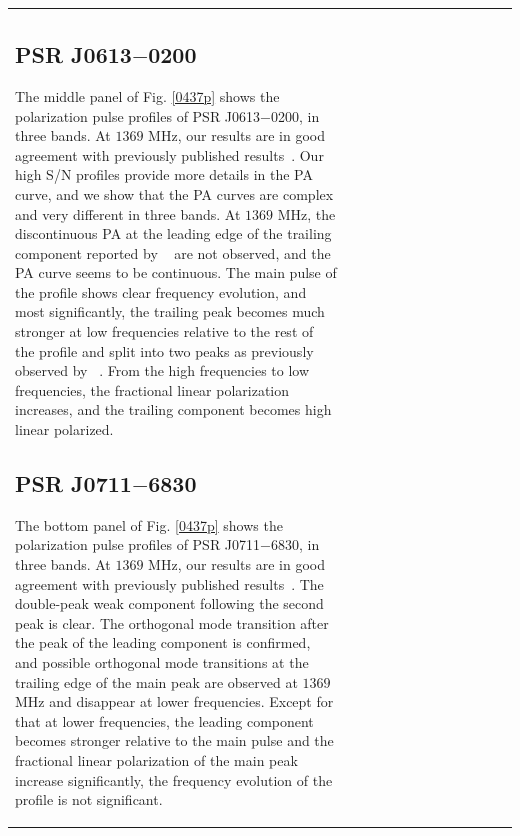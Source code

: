 \documentclass[useAMS,usenatbib]{mn2e}
\begin{document}
\begin{table}
\begin{center}
\begin{tabular}{lcccccccccccc}
\subsection{PSR J0613$-$0200}

The middle panel of Fig. \ref{0437p} shows the polarization pulse profiles of 
PSR J0613$-$0200, in three bands.
%
At $1369$ MHz, our results are in good agreement with previously published
results~\citep{Ord04,Yan11}. 
%
Our high S/N profiles provide more details in the PA curve, and we show that 
the PA curves are complex and very different in three bands. 
%
At $1369$ MHz, the discontinuous PA at the leading edge of the trailing 
component reported by ~\citet{Yan11} are not observed, and the PA curve seems 
to be continuous.
%
The main pulse of the profile shows clear frequency evolution, and most 
significantly, the trailing peak becomes much stronger at low frequencies 
relative to the rest of the profile and split into two peaks as previously
observed by ~\citet{Stairs99}.
%
From the high frequencies to low frequencies, the fractional linear 
polarization increases, and the trailing component becomes high linear 
polarized. 
%


\subsection{PSR J0711$-$6830}

The bottom panel of Fig. \ref{0437p} shows the polarization pulse profiles 
of PSR J0711$-$6830, in three bands.
%
At $1369$ MHz, our results are in good agreement with previously published
results~\citep{Ord04,Yan11}. 
%
The double-peak weak component following the second peak is clear.
%
The orthogonal mode transition after the peak of the leading component 
is confirmed, and possible orthogonal mode transitions at the trailing edge 
of the main peak are observed at $1369$ MHz and disappear at lower frequencies.
%
Except for that at lower frequencies, the leading component becomes stronger  
relative to the main pulse and the fractional linear polarization of the 
main peak increase significantly, the frequency evolution of the profile 
is not significant.


\end{tabular}
\end{center}
\end{table}
\end{document}
